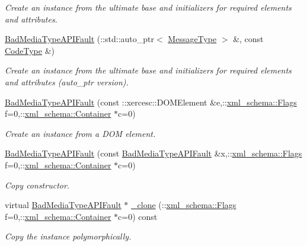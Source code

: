 \begin{DoxyCompactItemize}
\begin{DoxyCompactList}\small\item\em Create an instance from the ultimate base and initializers for required elements and attributes. \item\end{DoxyCompactList}\item 
\hyperlink{classopenstack_1_1xml_1_1BadMediaTypeAPIFault_a563d3c77729f8588b28fa8ae7d729c78}{BadMediaTypeAPIFault} (::std::auto\_\-ptr$<$ \hyperlink{classopenstack_1_1xml_1_1CloudServersAPIFault_aff7b9d2067747fa033a0ea4408011af6}{MessageType} $>$ \&, const \hyperlink{classopenstack_1_1xml_1_1CloudServersAPIFault_aa9f350c9dba08ae375b2a61568551550}{CodeType} \&)
\begin{DoxyCompactList}\small\item\em Create an instance from the ultimate base and initializers for required elements and attributes (auto\_\-ptr version). \item\end{DoxyCompactList}\item 
\hyperlink{classopenstack_1_1xml_1_1BadMediaTypeAPIFault_aca6a2986ab10f77da85c653eeb5d18fc}{BadMediaTypeAPIFault} (const ::xercesc::DOMElement \&e,::\hyperlink{namespacexml__schema_affb4c227cbd9aa7453dd1dc5a1401943}{xml\_\-schema::Flags} f=0,::\hyperlink{namespacexml__schema_a333dea2213742aea47a37532dec4ec27}{xml\_\-schema::Container} $\ast$c=0)
\begin{DoxyCompactList}\small\item\em Create an instance from a DOM element. \item\end{DoxyCompactList}\item 
\hyperlink{classopenstack_1_1xml_1_1BadMediaTypeAPIFault_ab72120d3b65f74ec1f7cf16dbf42b682}{BadMediaTypeAPIFault} (const \hyperlink{classopenstack_1_1xml_1_1BadMediaTypeAPIFault}{BadMediaTypeAPIFault} \&x,::\hyperlink{namespacexml__schema_affb4c227cbd9aa7453dd1dc5a1401943}{xml\_\-schema::Flags} f=0,::\hyperlink{namespacexml__schema_a333dea2213742aea47a37532dec4ec27}{xml\_\-schema::Container} $\ast$c=0)
\begin{DoxyCompactList}\small\item\em Copy constructor. \item\end{DoxyCompactList}\item 
virtual \hyperlink{classopenstack_1_1xml_1_1BadMediaTypeAPIFault}{BadMediaTypeAPIFault} $\ast$ \hyperlink{classopenstack_1_1xml_1_1BadMediaTypeAPIFault_a62e331662c29e3f9498dd2e7087ba08c}{\_\-clone} (::\hyperlink{namespacexml__schema_affb4c227cbd9aa7453dd1dc5a1401943}{xml\_\-schema::Flags} f=0,::\hyperlink{namespacexml__schema_a333dea2213742aea47a37532dec4ec27}{xml\_\-schema::Container} $\ast$c=0) const 
\begin{DoxyCompactList}\small\item\em Copy the instance polymorphically. \item\end{DoxyCompactList}\end{DoxyCompactItemize}


